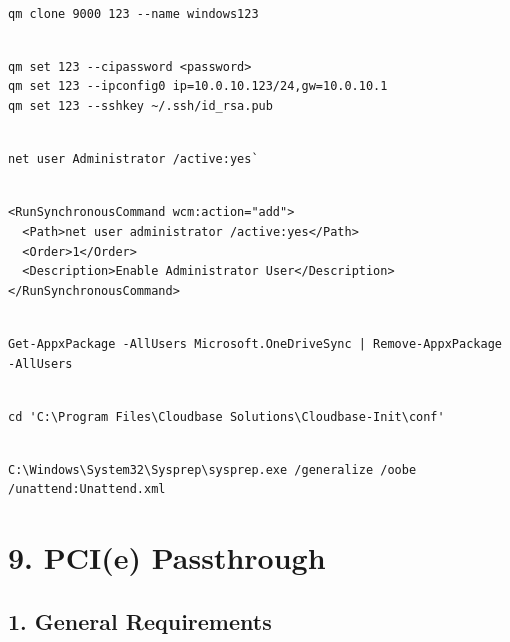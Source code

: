 \begin{lstlisting}

qm clone 9000 123 --name windows123

\end{lstlisting}

\begin{lstlisting}

qm set 123 --cipassword <password>
qm set 123 --ipconfig0 ip=10.0.10.123/24,gw=10.0.10.1
qm set 123 --sshkey ~/.ssh/id_rsa.pub

\end{lstlisting}

\begin{lstlisting}

net user Administrator /active:yes`

\end{lstlisting}

\begin{lstlisting}

<RunSynchronousCommand wcm:action="add">
  <Path>net user administrator /active:yes</Path>
  <Order>1</Order>
  <Description>Enable Administrator User</Description>
</RunSynchronousCommand>

\end{lstlisting}

\begin{lstlisting}

Get-AppxPackage -AllUsers Microsoft.OneDriveSync | Remove-AppxPackage -AllUsers

\end{lstlisting}

\begin{lstlisting}

cd 'C:\Program Files\Cloudbase Solutions\Cloudbase-Init\conf'

\end{lstlisting}

\begin{lstlisting}

C:\Windows\System32\Sysprep\sysprep.exe /generalize /oobe /unattend:Unattend.xml

\end{lstlisting}


\section{9. PCI(e) Passthrough}

\subsection{1. General Requirements}

